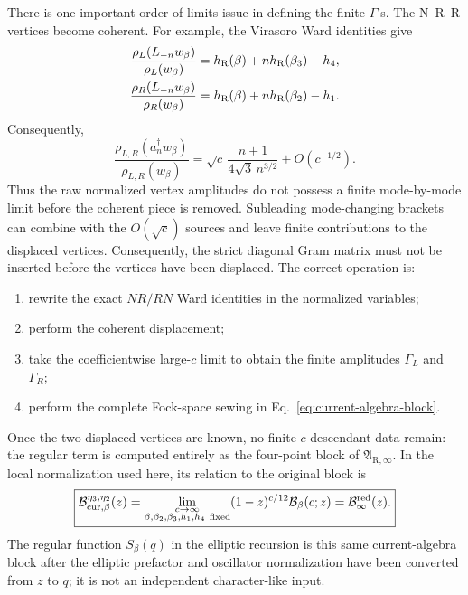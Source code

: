 \documentclass[11pt]{article}
\newcommand{\R}{\mathrm R}
\newcommand{\B}{\mathcal B}
\newcommand{\Ainf}{\mathfrak A_{\R,\infty}}
\begin{document}
There is one important order-of-limits issue in defining the finite
\(\Gamma\)'s.  The N--R--R vertices become coherent.  For example, the
Virasoro Ward identities give
\begin{align}
 \frac{\rho_L(L_{-n}w_\beta)}{\rho_L(w_\beta)}
 &=
 h_\R(\beta)+nh_\R(\beta_3)-h_4,
 \notag\\
 \frac{\rho_R(L_{-n}w_\beta)}{\rho_R(w_\beta)}
 &=
 h_\R(\beta)+nh_\R(\beta_2)-h_1.
 \label{eq:virasoro-ward}
\end{align}
Consequently,
\begin{equation}
 \frac{\rho_{L,R}(a_n^\dagger w_\beta)}
 {\rho_{L,R}(w_\beta)}
 =
 \sqrt c\,\frac{n+1}{4\sqrt3\,n^{3/2}}
 +O(c^{-1/2}).
 \label{eq:coherent-source}
\end{equation}
Thus the raw normalized vertex amplitudes do not possess a finite
mode-by-mode limit before the coherent piece is removed.  Subleading
mode-changing brackets can combine with the \(O(\sqrt c)\) sources and
leave finite contributions to the displaced vertices.  Consequently,
the strict diagonal Gram matrix must not be inserted before the
vertices have been displaced.  The correct operation is:
\begin{enumerate}
 \item rewrite the exact \(NR/RN\) Ward identities in the normalized
 variables;
 \item perform the coherent displacement;
 \item take the coefficientwise large-\(c\) limit to obtain the finite
 amplitudes \(\Gamma_L\) and \(\Gamma_R\);
 \item perform the complete Fock-space sewing in
 Eq.~\eqref{eq:current-algebra-block}.
\end{enumerate}
Once the two displaced vertices are known, no finite-\(c\) descendant
data remain: the regular term is computed entirely as the four-point
block of \(\Ainf\).  In the local normalization used here, its relation
to the original block is
\begin{equation}
 \boxed{
 \B_{{\rm cur},\beta}^{\eta_3,\eta_2}(z)
 =
 \lim_{\substack{c\to\infty\\
 \beta,\beta_2,\beta_3,h_1,h_4\ {\rm fixed}}}
 (1-z)^{c/12}\B_\beta(c;z)
 =\B_\infty^{\rm red}(z).}
 \label{eq:regular-is-current-block}
\end{equation}
The regular function \(S_\beta(q)\) in the elliptic recursion is this
same current-algebra block after the elliptic prefactor and oscillator
normalization have been converted from \(z\) to \(q\); it is not an
independent character-like input.
\end{document}
